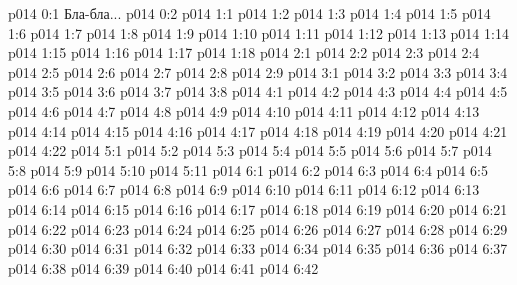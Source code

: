 \author{Совершенствователь Мудрости}
\vs p014 0:1  Бла-бла...
\vs p014 0:2 
\vs p014 1:1 
\vs p014 1:2 
\vs p014 1:3 
\vs p014 1:4 
\vs p014 1:5 
\vs p014 1:6 
\vs p014 1:7 
\vs p014 1:8 
\vs p014 1:9 \pc 
\vs p014 1:10 
\vs p014 1:11 \pc 
\vs p014 1:12 
\vs p014 1:13 
\vs p014 1:14 \pc 
\vs p014 1:15 
\vs p014 1:16 
\vs p014 1:17 
\vs p014 1:18 
\vs p014 2:1 
\vs p014 2:2 
\vs p014 2:3 
\vs p014 2:4 
\vs p014 2:5 \pc 
\vs p014 2:6 
\vs p014 2:7 
\vs p014 2:8 
\vs p014 2:9 \pc 
{}
\vs p014 3:1 
\vs p014 3:2 
\vs p014 3:3 
\vs p014 3:4 
\vs p014 3:5 
\vs p014 3:6 
\vs p014 3:7 
\vs p014 3:8 
\vs p014 4:1 
\vs p014 4:2 
\vs p014 4:3 
\vs p014 4:4 
\vs p014 4:5 
\vs p014 4:6 
\vs p014 4:7 
\vs p014 4:8 
\vs p014 4:9 \pc 
\vs p014 4:10 \pc 
\vs p014 4:11 
\vs p014 4:12 
\vs p014 4:13 
\vs p014 4:14 
\vs p014 4:15 
\vs p014 4:16 
\vs p014 4:17 
\vs p014 4:18 \pc 
\vs p014 4:19 
\vs p014 4:20 
\vs p014 4:21 
\vs p014 4:22 
\vs p014 5:1 
\vs p014 5:2 
\vs p014 5:3 
\vs p014 5:4 \pc 
\vs p014 5:5 
\vs p014 5:6 \pc 
\vs p014 5:7 
\vs p014 5:8 
\vs p014 5:9 
\vs p014 5:10 
\vs p014 5:11 
\vs p014 6:1 
\vs p014 6:2 
\vs p014 6:3 
\vs p014 6:4 
\vs p014 6:5 \pc 
\vs p014 6:6 
\vs p014 6:7 
\vs p014 6:8 
\vs p014 6:9 
\vs p014 6:10 
\vs p014 6:11 
\vs p014 6:12 
\vs p014 6:13 
\vs p014 6:14 
\vs p014 6:15 
\vs p014 6:16 
\vs p014 6:17 
\vs p014 6:18 
\vs p014 6:19 
\vs p014 6:20 
\vs p014 6:21 
\vs p014 6:22 
\vs p014 6:23 
\vs p014 6:24 
\vs p014 6:25 
\vs p014 6:26 
\vs p014 6:27 
\vs p014 6:28 
\vs p014 6:29 
\vs p014 6:30 
\vs p014 6:31 
\vs p014 6:32 
\vs p014 6:33 
\vs p014 6:34 
\vs p014 6:35 
\vs p014 6:36 
\vs p014 6:37 
\vs p014 6:38 
\vs p014 6:39 
\vs p014 6:40 
\vs p014 6:41 \pc 
\vsetoff
\vs p014 6:42 
\quizlink
